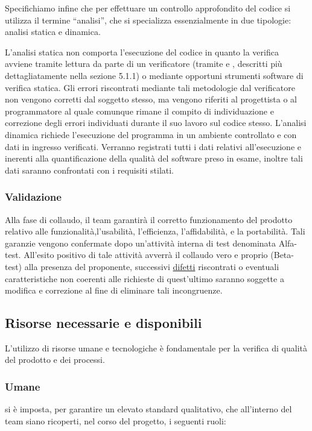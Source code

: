 Specifichiamo infine che per effettuare un controllo approfondito del codice si utilizza il termine ``analisi'', che si specializza essenzialmente in due tipologie: analisi statica e dinamica.

L'analisi statica non comporta l'esecuzione del codice in quanto la verifica avviene tramite lettura da parte di un verificatore (tramite \underline{} e \underline{}, descritti più dettagliatamente nella sezione 5.1.1) o mediante opportuni strumenti software di verifica statica. Gli errori riscontrati mediante tali metodologie dal verificatore non vengono corretti dal soggetto stesso, ma vengono riferiti al progettista o al programmatore al quale comunque rimane il compito di individuazione e correzione degli errori individuati durante il suo lavoro sul codice stesso.
L'analisi dinamica richiede l'esecuzione del programma in un ambiente controllato e con dati in ingresso verificati. Verranno registrati tutti i dati relativi all'esecuzione e inerenti alla quantificazione della qualità del software preso in esame, inoltre tali dati saranno confrontati con i requisiti stilati.

    
\subsubsection{Validazione}
Alla fase di collaudo, il team garantirà il corretto funzionamento del prodotto \caName{} relativo alle funzionalità,l'usabilità, l'efficienza, l'affidabilità, e la portabilità. Tali garanzie vengono confermate dopo un'attività interna di test denominata Alfa-test. All'esito positivo di tale attività avverrà il collaudo vero e proprio (Beta-test) alla presenza del proponente, successivi \underline{difetti} riscontrati o eventuali caratteristiche non coerenti alle richieste di quest'ultimo saranno soggette a modifica e correzione al fine di eliminare tali incongruenze.
\clearpage

\subsection{Risorse necessarie e disponibili}
L'utilizzo di risorse umane e tecnologiche è fondamentale per la verifica di qualità del prodotto e dei processi.

\subsubsection{Umane}
\team{} si è imposta, per garantire un elevato standard qualitativo, che all'interno del team siano ricoperti, nel corso del progetto, i seguenti ruoli:

